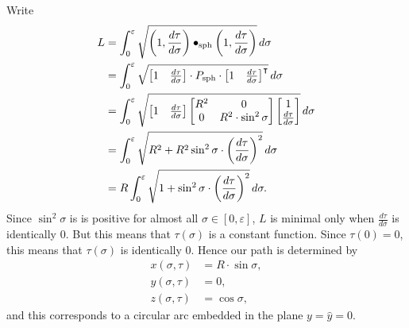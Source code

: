 \documentclass[newpage,hints,handout,noauthor,nooutcomes,12pt]{ximera}
\begin{document}
\begin{problem}
  \begin{freeResponse}
    Write
    \begin{align*}
    L  &=\int_{0}^{\varepsilon} \sqrt{\left(1,\dd[\tau]{\sigma}\right)\bullet_\mathrm{sph} \left(1,\dd[\tau]{\sigma}\right)}\d\sigma\\
    &= \int_{0}^{\varepsilon} \sqrt{
      \begin{bmatrix} 1 & \dd[\tau]{\sigma}
      \end{bmatrix} \cdot P_\mathrm{sph}\cdot
      \begin{bmatrix} 1 & \dd[\tau]{\sigma}
      \end{bmatrix}^\transpose}\d\sigma \\
    &= \int_{0}^{\varepsilon} \sqrt{
      \begin{bmatrix} 1 & \dd[\tau]{\sigma}
      \end{bmatrix}
      \begin{bmatrix}
        R^2 & 0 \\
        0 & R^2\cdot\sin^2 \sigma
      \end{bmatrix}
      \begin{bmatrix} 1 \\ \dd[\tau]{\sigma}
    \end{bmatrix}}\d\sigma \\
    &= \int_{0}^{\varepsilon} \sqrt{
      R^2+R^2\sin^{2}\sigma\cdot \left(\frac{d\tau }{d\sigma}\right)^{2}
    }\d\sigma \\
    &= R\int_{0}^{\varepsilon} \sqrt{
      1+\sin^{2}\sigma\cdot \left(\frac{d\tau }{d\sigma}\right)^{2}
    }\d\sigma.
    \end{align*}
   Since $\sin^{2}\sigma$ is is positive for almost all $\sigma\in[
     0,\varepsilon] $, $L$ is minimal only when
   $\frac{d\tau}{d\sigma}$ is identically $0$. But this means that
   $\tau\left( \sigma\right) $ is a constant function. Since
   $\tau\left( 0\right) =0$, this means that $\tau\left( \sigma\right)
   $ is identically $0$. Hence our path is determined by
   \begin{align*}
     x(\sigma,\tau) &=R\cdot \sin\sigma,\\
     y(\sigma,\tau) &=0,\\
     z(\sigma,\tau) &=\cos \sigma,
   \end{align*}
   and this corresponds to a circular arc embedded in the plane
   $y=\hat{y}=0$.
  \end{freeResponse}

\end{problem}
\end{document}
